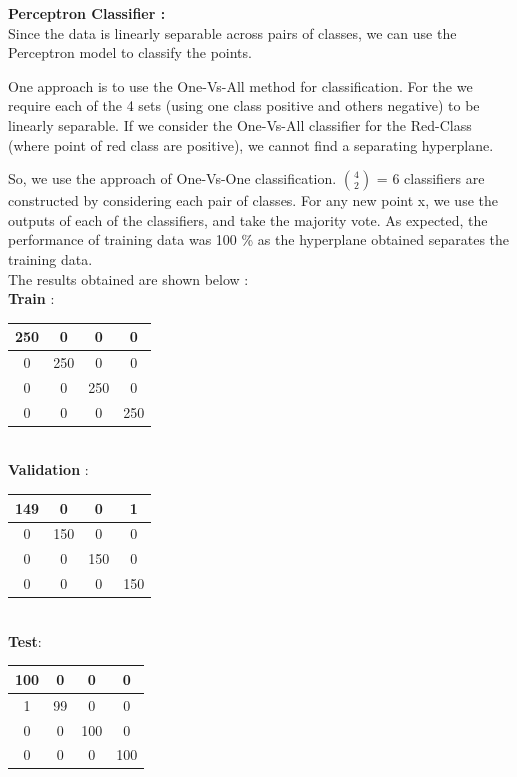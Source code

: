 \documentclass{article}
\begin{document}
\begin{flushleft}
\textbf{Perceptron Classifier :}  \\[10pt]

Since the data is linearly separable across pairs of classes, we can use the Perceptron model to classify the points. 

One approach is to use the One-Vs-All method for classification.  For the we require each of the 4 sets (using one class positive and others negative) to be linearly separable. If we consider the One-Vs-All classifier for the Red-Class (where point of red class are positive), we cannot find a separating hyperplane.

So, we use the approach of One-Vs-One classification.  $ 4 \choose 2 $ = 6 classifiers are constructed by considering each pair of classes. For any new point x, we use the outputs of each of the classifiers, and take the majority vote. As expected, the performance of training data was 100 \% as the hyperplane obtained separates the training data.  \\[10pt]

\newpage
The results obtained are shown below  :\\[10pt]

\textbf{Train} : \\[10pt]


\begin{tabular}{|c|c|c|c|} \hline 250 & 0 & 0 & 0\\ \hline 0 & 250 & 0 & 0\\ \hline 0 & 0 & 250 & 0\\ \hline 0 & 0 & 0 & 250 \\ \hline \end{tabular} \\[10pt]

\textbf{Validation} : \\[10pt]

\begin{tabular}{|c|c|c|c|}  \hline 149 & 0 & 0 & 1\\ \hline 0 & 150 & 0 & 0\\ \hline 0 & 0 & 150 & 0\\ \hline 0 & 0 & 0 & 150 \\ \hline \end{tabular}  \\[10pt]


\textbf{Test}: \\[10pt]


\begin{tabular}{|c|c|c|c|}\hline 100 & 0 & 0 & 0\\ \hline 1 & 99 & 0 & 0\\ \hline 0 & 0 & 100 & 0\\ \hline 0 & 0 & 0 & 100 \\ \hline \end{tabular} \\[10pt]




\end{flushleft}
\end{document}
